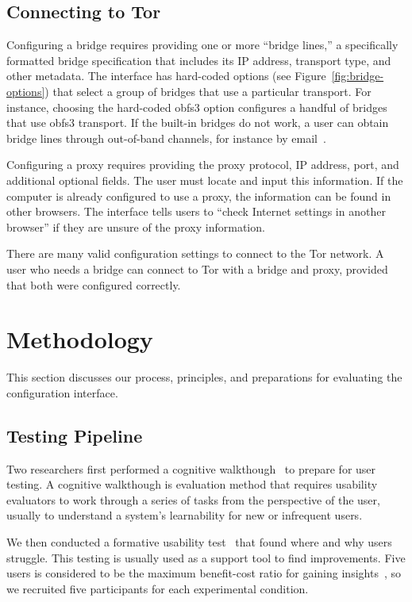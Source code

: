 \documentclass[USenglish,oneside,twocolumn]{article}
\begin{document}
\subsection{Connecting to Tor} 
Configuring a bridge requires providing one or more
``bridge lines,'' a specifically formatted bridge specification that
includes its IP address, transport type, and other metadata.
The interface has hard-coded options (see Figure~\ref{fig:bridge-options}) 
that select a group of bridges that use a particular transport.
For instance, choosing the hard-coded obfs3 option
configures a handful of bridges that use obfs3 transport.
If the built-in bridges do not work, a user can obtain bridge lines
through out-of-band channels, for instance by email~\cite{bridgedb}.

Configuring a proxy requires providing the proxy protocol, IP address, port, and additional optional fields. The user must locate and input this information. If the computer is already configured to use a proxy, the information can be found in other browsers. The interface tells users to ``check Internet settings in another browser'' if they are unsure of the proxy information. 

There are many valid configuration settings to connect to the Tor network.
A user who needs a bridge can connect to Tor with a bridge and proxy, provided that both were configured correctly.

\section{Methodology} 
This section discusses our process, principles, and preparations for evaluating the configuration interface.

\subsection{Testing Pipeline} 
Two researchers first performed a cognitive walkthough~\cite{cognitive-walkthrough} to prepare for user testing. A cognitive walkthough is evaluation method that requires usability evaluators to work through a series of tasks from the perspective of the user, usually to understand a system's learnability for new or infrequent users.

We then conducted a formative usability test~\cite{formative} that found where and why users struggle. This testing is usually used as a support tool to find improvements. Five users is considered to be the maximum benefit-cost ratio for gaining insights~\cite{howmanyusers}, so we recruited five participants for each experimental condition. 
\end{document}
